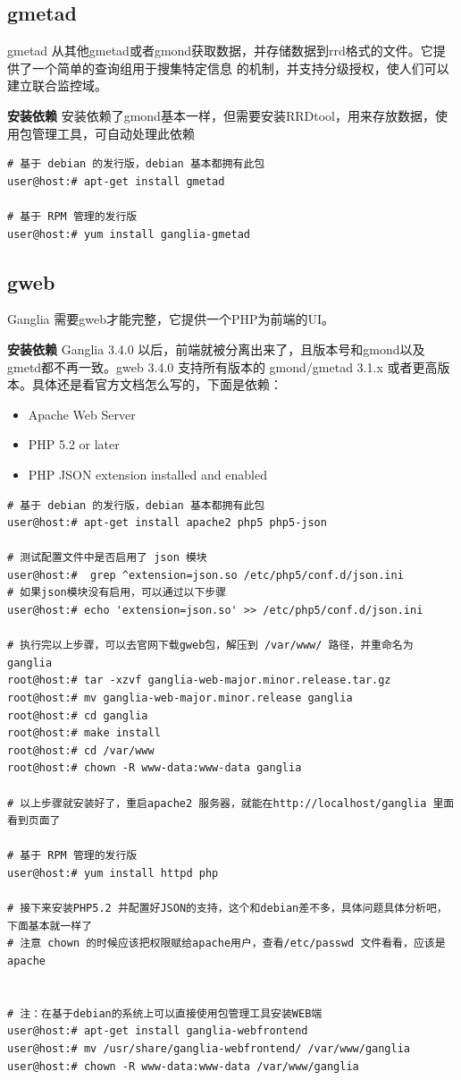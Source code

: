 \documentclass{article}
\begin{document}
\subsection{gmetad}
gmetad 从其他gmetad或者gmond获取数据，并存储数据到rrd格式的文件。它提供了一个简单的查询组用于搜集特定信息
的机制，并支持分级授权，使人们可以建立联合监控域。

\textbf{安装依赖}
安装依赖了gmond基本一样，但需要安装RRDtool，用来存放数据，使用包管理工具，可自动处理此依赖

\begin{verbatim}
# 基于 debian 的发行版，debian 基本都拥有此包
user@host:# apt-get install gmetad

# 基于 RPM 管理的发行版
user@host:# yum install ganglia-gmetad
\end{verbatim}

\subsection{gweb}
Ganglia 需要gweb才能完整，它提供一个PHP为前端的UI。

\textbf{安装依赖}
Ganglia 3.4.0 以后，前端就被分离出来了，且版本号和gmond以及gmetd都不再一致。gweb 3.4.0 支持所有版本的
gmond/gmetad 3.1.x 或者更高版本。具体还是看官方文档怎么写的，下面是依赖：

\begin{itemize}
\item Apache Web Server
\item PHP 5.2 or later
\item PHP JSON extension installed and enabled
\end{itemize}

\begin{verbatim}
# 基于 debian 的发行版，debian 基本都拥有此包
user@host:# apt-get install apache2 php5 php5-json

# 测试配置文件中是否启用了 json 模块
user@host:#  grep ^extension=json.so /etc/php5/conf.d/json.ini
# 如果json模块没有启用，可以通过以下步骤
user@host:# echo 'extension=json.so' >> /etc/php5/conf.d/json.ini

# 执行完以上步骤，可以去官网下载gweb包，解压到 /var/www/ 路径，并重命名为 ganglia
root@host:# tar -xzvf ganglia-web-major.minor.release.tar.gz 
root@host:# mv ganglia-web-major.minor.release ganglia
root@host:# cd ganglia
root@host:# make install
root@host:# cd /var/www
root@host:# chown -R www-data:www-data ganglia

# 以上步骤就安装好了，重启apache2 服务器，就能在http://localhost/ganglia 里面看到页面了

# 基于 RPM 管理的发行版
user@host:# yum install httpd php

# 接下来安装PHP5.2 并配置好JSON的支持，这个和debian差不多，具体问题具体分析吧，下面基本就一样了
# 注意 chown 的时候应该把权限赋给apache用户，查看/etc/passwd 文件看看，应该是apache


# 注：在基于debian的系统上可以直接使用包管理工具安装WEB端
user@host:# apt-get install ganglia-webfrontend
user@host:# mv /usr/share/ganglia-webfrontend/ /var/www/ganglia
user@host:# chown -R www-data:www-data /var/www/ganglia
\end{verbatim}
\end{document}
